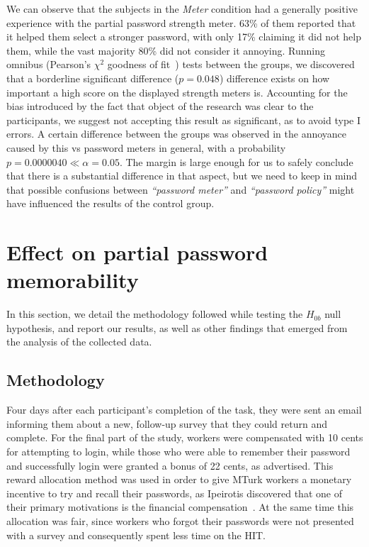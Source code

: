     We can observe that the subjects in the \emph{Meter} condition had a generally positive experience with the partial password strength meter. 63\% of them reported that it helped them select a stronger password, with only 17\% claiming it did not help them, while the vast majority 80\% did not consider it annoying. Running omnibus (Pearson's $\chi^2$ goodness of fit~\cite{chi_sq}) tests between the groups, we discovered that a borderline significant difference ($p=0.048$) difference exists on how important a high score on the displayed strength meters is. Accounting for the bias introduced by the fact that object of the research was clear to the participants, we suggest not accepting this result as significant, as to avoid type I errors. A certain difference between the groups was observed in the annoyance caused by this vs password meters in general, with a probability $p=0.0000040 \ll \alpha = 0.05$. The margin is large enough for us to safely conclude that there is a substantial difference in that aspect, but we need to keep in mind that possible confusions between \emph{``password meter''} and \emph{``password policy''} might have influenced the results of the control group.


\section{Effect on partial password memorability}
  \label{sec:memorability}
  In this section, we detail the methodology followed while testing the $H_{0b}$ null hypothesis, and report our results, as well as other findings that emerged from the analysis of the collected data.

  \subsection{Methodology}
    \label{ssec:memorability_setup}
    Four days after each participant's completion of the task, they were sent an email informing them about a new, follow-up survey that they could return and complete. For the final part of the study, workers were compensated with 10 cents for attempting to login, while those who were able to remember their password and successfully login were granted a bonus of 22 cents, as advertised. This reward allocation method was used in order to give MTurk workers a monetary incentive to try and recall their passwords, as Ipeirotis discovered that one of their primary motivations is the financial compensation~\cite{mturk_demographic}. At the same time this allocation was fair, since workers who forgot their passwords were not presented with a survey and consequently spent less time on the HIT.

